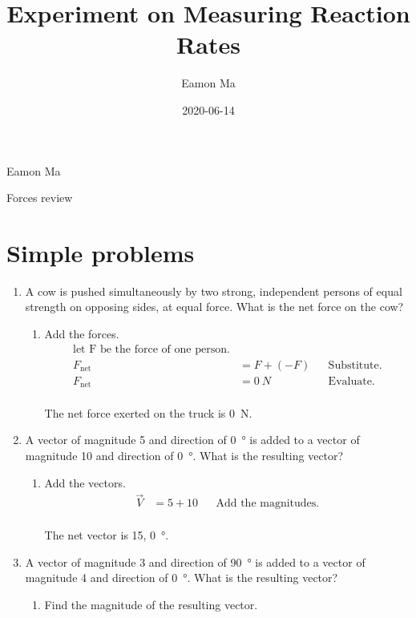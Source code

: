 \documentclass[letterpaper, 12pt]{report}
\title{Experiment on Measuring Reaction Rates}
\author{Eamon Ma}
\date{2020-06-14}
\begin{document}
\renewcommand{\arraystretch}{1.7}
\hfill
Eamon Ma

\begin{center}
    \LARGE{Forces review}
\end{center}

\section*{Simple problems}
\begin{enumerate}
    \item A cow is pushed simultaneously by two strong, independent persons of equal strength on opposing sides, at equal force. What is the net force on the cow?
    \begin{enumerate}
        \item Add the forces.
        \begin{align}
            \text{let F be the force of one person.} \\
            F_{\text{net}} &= F + (-F)  && \text{Substitute.} \\
            F_{\text{net}} &= \SI{0}{N} && \text{Evaluate.} 
        \end{align}
        \hfill
        \\
        The net force exerted on the truck is \SI{0}{N}.
        \\   
    \end{enumerate}
    \item A vector of magnitude 5 and direction of \SI{0}{\degree} is added to a vector of magnitude 10 and direction of \SI{0}{\degree}. What is the resulting vector?
    \begin{enumerate}
        \item Add the vectors.
        \begin{align}
            \vec{V} &= 5 + 10 && \text{Add the magnitudes.}
        \end{align}
        \\
        The net vector is 15, \SI{0}{\degree}.
        \\
    \end{enumerate}
    \item A vector of magnitude 3 and direction of \SI{90}{\degree} is added to a vector of magnitude 4 and direction of \SI{0}{\degree}. What is the resulting vector?
    \begin{enumerate}
        \item Find the magnitude of the resulting vector.
        \begin{align}

\end{align}
\end{enumerate}
\end{enumerate}
\end{document}
